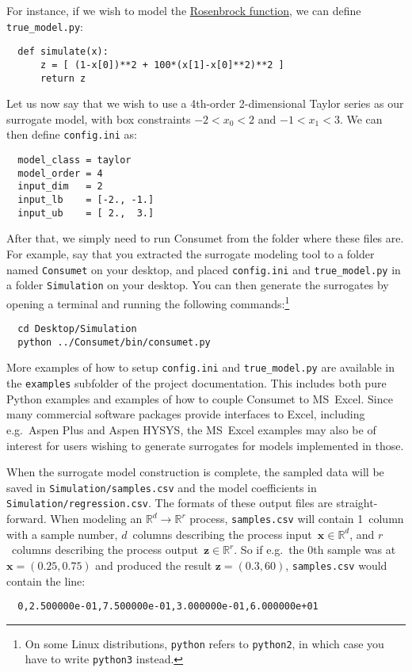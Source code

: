 \documentclass[a4paper,bibliography=numbered]{scrartcl}
\begin{document}
\newpage
For instance, if we wish to model the \href{https://en.wikipedia.org/wiki/Rosenbrock_function}{Rosenbrock function}, we can define \texttt{true\_model.py}:
\begin{lstlisting}
  def simulate(x):
      z = [ (1-x[0])**2 + 100*(x[1]-x[0]**2)**2 ]
      return z
\end{lstlisting}
Let us now say that we wish to use a 4th-order 2-dimensional Taylor series as our surrogate model, with box constraints $-2 < x_0 < 2$ and $-1 < x_1 < 3$.
We can then define \texttt{config.ini} as:
\begin{lstlisting}
  model_class = taylor
  model_order = 4
  input_dim   = 2
  input_lb    = [-2., -1.]
  input_ub    = [ 2.,  3.]
\end{lstlisting}
After that, we simply need to run Consumet from the folder where these files are.
For example, say that you extracted the surrogate modeling tool to a folder named \texttt{Consumet} on your desktop, and placed \texttt{config.ini} and \texttt{true\_model.py} in a folder \texttt{Simulation} on your desktop.
You can then generate the surrogates by opening a terminal and running the following commands:\footnote{On some Linux distributions, \texttt{python} refers to \texttt{python2}, in which case you have to write \texttt{python3} instead.}
\begin{lstlisting}
  cd Desktop/Simulation
  python ../Consumet/bin/consumet.py
\end{lstlisting}
More examples of how to setup \texttt{config.ini} and \texttt{true\_model.py} are available in the \texttt{examples} subfolder of the project documentation.
This includes both pure Python examples and examples of how to couple Consumet to MS~Excel.
Since many commercial software packages provide interfaces to Excel, including e.g.\ Aspen Plus and Aspen HYSYS, the MS~Excel examples may also be of interest for users wishing to generate surrogates for models implemented in those.

When the surrogate model construction is complete, the sampled data will be saved in \texttt{Simulation/samples.csv} and the model coefficients in \texttt{Simulation/regression.csv}.
The formats of these output files are straight-forward.
When modeling an $\mathbb{R}^d \rightarrow \mathbb{R}^r$ process, \texttt{samples.csv} will contain 1~column with a sample number, $d$~columns describing the process input~$\bm{x}\in\mathbb{R}^d$, and $r$~columns describing the process output~$\bm{z}\in\mathbb{R}^r$.
So if e.g.\ the 0th sample was at $\bm{x} = (0.25,0.75)$ and produced the result $\bm{z} = (0.3,60)$, \texttt{samples.csv} would contain the line:
\begin{lstlisting}
  0,2.500000e-01,7.500000e-01,3.000000e-01,6.000000e+01
\end{lstlisting}
\end{document}

